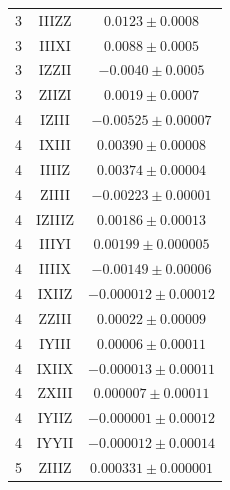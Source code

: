 \documentclass[twocolumn,superscriptaddress,aps,showpacs,amsmath,amstex,amssymb,citeautoscript,floatfix,pra,preprintnumbers]{revtex4-2}
\theoremstyle{plain}
\theoremstyle{plain}
\theoremstyle{plain}
\theoremstyle{plain}
\theoremstyle{plain}
\theoremstyle{plain}
\begin{document}
\begin{appendix}
\begin{table}[htbp]
\begin{ruledtabular}
\begin{tabular}{lcc}
3 & IIIZZ & $0.0123 \pm 0.0008$ \\
3 & IIIXI & $0.0088 \pm 0.0005$ \\
3 & IZZII & $-0.0040 \pm 0.0005$ \\
3 & ZIIZI & $0.0019 \pm 0.0007$ \\
\midrule
4 & IZIII & $-0.00525 \pm 0.00007$ \\
4 & IXIII & $0.00390 \pm 0.00008$ \\
4 & IIIIZ & $0.00374 \pm 0.00004$ \\
4 & ZIIII & $-0.00223 \pm 0.00001$ \\
4 & IZIIIZ & $0.00186 \pm 0.00013$ \\
4 & IIIYI & $0.00199 \pm 0.000005$ \\
4 & IIIIX & $-0.00149 \pm 0.00006$ \\
4 & IXIIZ & $-0.000012 \pm 0.00012$ \\
4 & ZZIII & $0.00022 \pm 0.00009$ \\
4 & IYIII & $0.00006 \pm 0.00011$ \\
4 & IXIIX & $-0.000013 \pm 0.00011$ \\
4 & ZXIII & $0.000007 \pm 0.00011$ \\
4 & IYIIZ & $-0.000001 \pm 0.00012$ \\
4 & IYYII & $-0.000012 \pm 0.00014$ \\
\midrule
5 & ZIIIZ & $0.000331 \pm 0.000001$ \\
\end{tabular}
\end{ruledtabular}
\end{table}

\end{appendix}
\end{document}
